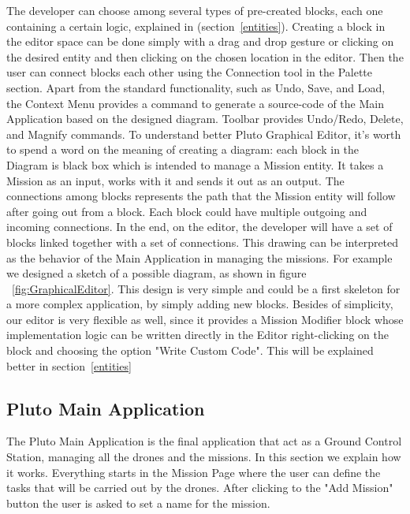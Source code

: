 The developer can choose among several types of pre-created blocks, each one containing a certain logic, explained in (section~\ref{entities}). Creating a block in the editor space can be done simply with a drag and drop gesture or clicking on the desired entity and then clicking on the chosen location in the editor. Then the user can connect blocks each other using the Connection tool in the Palette section.
Apart from the standard functionality, such as Undo, Save, and Load, the Context Menu provides a command to generate a source-code of the Main Application based on the designed diagram. Toolbar provides Undo/Redo, Delete, and Magnify commands.
To understand better Pluto Graphical Editor, it's worth to spend a word on the meaning of creating a diagram: each block in the Diagram is black box which is intended to manage a Mission entity. It takes a Mission as an input, works with it and sends it out as an output. The connections among blocks represents the path that the Mission entity will follow after going out from a block. Each block could have multiple outgoing and incoming connections.
In the end, on the editor, the developer will have a set of blocks linked together with a set of connections. This drawing can be interpreted as the behavior of the Main Application in managing the missions. For example we designed a sketch of a possible diagram, as shown in figure ~\ref{fig:GraphicalEditor}. This design is very simple and could be a first skeleton for a more complex application, by simply adding new blocks.
Besides of simplicity, our editor is very flexible as well, since it provides a Mission Modifier block whose implementation logic can be written directly in the Editor right-clicking on the block and choosing the option "Write Custom Code". This will be explained better in section~\ref{entities}

\subsection{Pluto Main Application}
\label{plutoMainApp}

The Pluto Main Application is the final application that act as a Ground Control Station, managing all the drones and the missions. In this section we explain how it works.
Everything starts in the Mission Page where the user can define the tasks that will be carried out by the drones. After clicking to the "Add Mission" button the user is asked to set a name for the mission.

